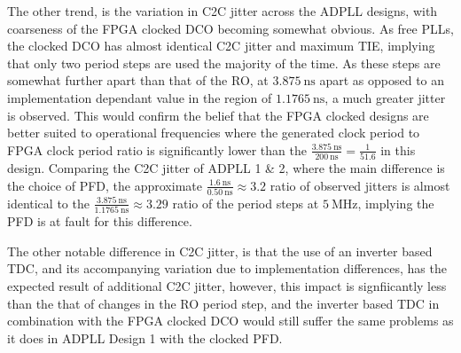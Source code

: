 The other trend, is the variation in \ac{C2C} jitter across the \ac{ADPLL} designs, with coarseness of the \ac{FPGA} clocked \ac{DCO} becoming somewhat obvious. As free \ac{PLL}s, the clocked \ac{DCO} has almost identical \ac{C2C} jitter and maximum \ac{TIE}, implying that only two period steps are used the majority of the time. As these steps are somewhat further apart than that of the \ac{RO}, at $3.875~\si{\nano\second}$ apart as opposed to an implementation dependant value in the region of $1.1765~\si{\nano\second}$, a much greater jitter is observed. This would confirm the belief that the \ac{FPGA} clocked designs are better suited to operational frequencies where the generated clock period to \ac{FPGA} clock period ratio is significantly lower than the $\frac{3.875~\si{\nano\second}}{200~\si{\nano\second}} = \frac{1}{51.6}$ in this design. Comparing the \ac{C2C} jitter of \ac{ADPLL} 1 \& 2, where the main difference is the choice of \ac{PFD}, the approximate $\frac{1.6~\si{\nano\second}}{0.50~\si{\nano\second}} \approx 3.2$ ratio of observed jitters is almost identical to the $\frac{3.875~\si{\nano\second}}{1.1765~\si{\nano\second}} \approx 3.29$ ratio of the period steps at $5~\si{\mega\hertz}$, implying the \ac{PFD} is at fault for this difference.

The other notable difference in \ac{C2C} jitter, is that the use of an inverter based \ac{TDC}, and its accompanying variation due to implementation differences, has the expected result of additional \ac{C2C} jitter, however, this impact is signfiicantly less than the that of changes in the \ac{RO} period step, and the inverter based \ac{TDC} in combination with the \ac{FPGA} clocked \ac{DCO} would still suffer the same problems as it does in \ac{ADPLL} Design 1 with the clocked \ac{PFD}.


